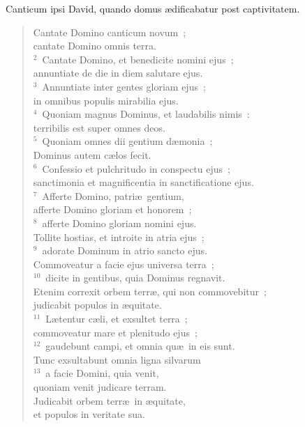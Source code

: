 \lettrine[lines=3,image=true,loversize=0.05,lraise=-0.03]{C}{}anticum ipsi David, quando domus \ae dificabatur post captivitatem. \begin{flushleft}\begin{verse}\vspace{6pt}Cantate Domino canticum novum~;\\ cantate Domino omnis terra.\\
${}^{2}$~Cantate Domino, et benedicite nomini ejus~;\\ annuntiate de die in diem salutare ejus.\\
${}^{3}$~Annuntiate inter gentes gloriam ejus~;\\ in omnibus populis mirabilia ejus.\\
${}^{4}$~Quoniam magnus Dominus, et laudabilis nimis~:\\ terribilis est super omnes deos.\\
${}^{5}$~Quoniam omnes dii gentium d\ae monia~;\\ Dominus autem c\ae los fecit.\\
${}^{6}$~Confessio et pulchritudo in conspectu ejus~;\\ sanctimonia et magnificentia in sanctificatione ejus.\\
${}^{7}$~Afferte Domino, patri\ae\ gentium,\\ afferte Domino gloriam et honorem~;\\
${}^{8}$~afferte Domino gloriam nomini ejus.\\ Tollite hostias, et introite in atria ejus~;\\
${}^{9}$~adorate Dominum in atrio sancto ejus.\\ Commoveatur a facie ejus universa terra~;\\
${}^{10}$~dicite in gentibus, quia Dominus regnavit.\\ Etenim correxit orbem terr\ae , qui non commovebitur~;\\ judicabit populos in \ae quitate.\\
${}^{11}$~L\ae tentur c\ae li, et exsultet terra~;\\ commoveatur mare et plenitudo ejus~;\\
${}^{12}$~gaudebunt campi, et omnia qu\ae\ in eis sunt.\\ Tunc exsultabunt omnia ligna silvarum\\
${}^{13}$~a facie Domini, quia venit,\\ quoniam venit judicare terram.\\ Judicabit orbem terr\ae\ in \ae quitate,\\ et populos in veritate sua.\end{verse}\end{flushleft}



